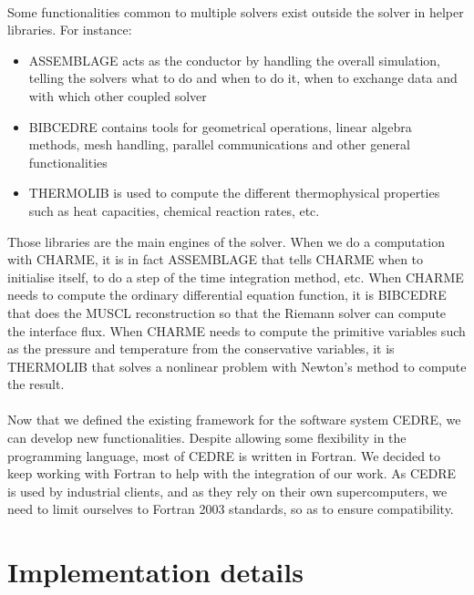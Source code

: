     \paragraph{}
    Some functionalities common to multiple solvers exist outside the solver in helper libraries.
    For instance:
    \begin{itemize}
      \item ASSEMBLAGE acts as the conductor by handling the overall simulation, telling the solvers what to do and when to do it, when to exchange data and with which other coupled solver
      \item BIBCEDRE contains tools for geometrical operations, linear algebra methods, mesh handling, parallel communications and other general functionalities
      \item THERMOLIB is used to compute the different thermophysical properties such as heat capacities, chemical reaction rates, etc. 
    \end{itemize}
    Those libraries are the main engines of the solver.
    When we do a computation with CHARME, it is in fact ASSEMBLAGE that tells CHARME when to initialise itself, to do a step of the time integration method, etc.
    When CHARME needs to compute the ordinary differential equation function, it is BIBCEDRE that does the MUSCL reconstruction  so that the Riemann solver can compute the interface flux.
    When CHARME needs to compute the primitive variables such as the pressure and temperature from the conservative variables, it is THERMOLIB that solves a nonlinear problem with Newton's method to compute the result.

    \paragraph{}
    Now that we defined the existing framework for the software system CEDRE, we can develop new functionalities.
    Despite allowing some flexibility in the programming language, most of CEDRE is written in Fortran.
    We decided to keep working with Fortran to help with the integration of our work.
    As CEDRE is used by industrial clients, and as they rely on their own supercomputers, we need to limit ourselves to Fortran 2003 standards, so as to ensure compatibility.


  \section{Implementation details}


